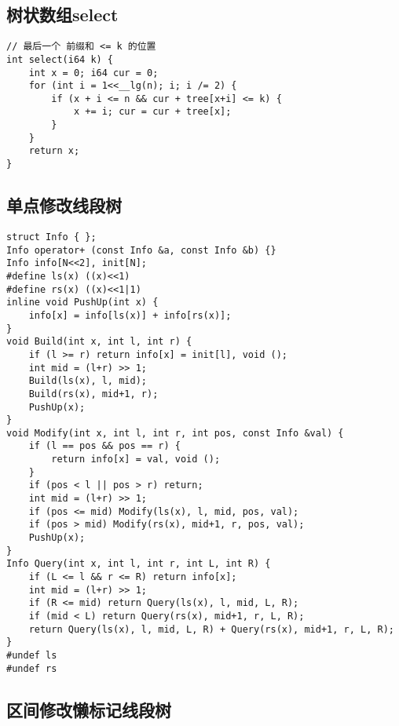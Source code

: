 \documentclass[a4paper,landscape,twocolumn]{ctexart}
\begin{document}
\subsection{树状数组select}

\begin{lstlisting}
// 最后一个 前缀和 <= k 的位置
int select(i64 k) {
	int x = 0; i64 cur = 0;
	for (int i = 1<<__lg(n); i; i /= 2) {
		if (x + i <= n && cur + tree[x+i] <= k) {
			x += i; cur = cur + tree[x];
		}
	}
	return x;
}
\end{lstlisting}

\subsection{单点修改线段树}

\begin{lstlisting}
struct Info { };
Info operator+ (const Info &a, const Info &b) {}
Info info[N<<2], init[N];
#define ls(x) ((x)<<1)
#define rs(x) ((x)<<1|1)
inline void PushUp(int x) {
	info[x] = info[ls(x)] + info[rs(x)];
}
void Build(int x, int l, int r) {
	if (l >= r) return info[x] = init[l], void ();
	int mid = (l+r) >> 1;
	Build(ls(x), l, mid);
	Build(rs(x), mid+1, r);
	PushUp(x);
}
void Modify(int x, int l, int r, int pos, const Info &val) {
	if (l == pos && pos == r) {
		return info[x] = val, void ();
	}
	if (pos < l || pos > r) return;
	int mid = (l+r) >> 1;
	if (pos <= mid) Modify(ls(x), l, mid, pos, val);
	if (pos > mid) Modify(rs(x), mid+1, r, pos, val);
	PushUp(x);
}
Info Query(int x, int l, int r, int L, int R) {
	if (L <= l && r <= R) return info[x];
	int mid = (l+r) >> 1;
	if (R <= mid) return Query(ls(x), l, mid, L, R);
	if (mid < L) return Query(rs(x), mid+1, r, L, R);
	return Query(ls(x), l, mid, L, R) + Query(rs(x), mid+1, r, L, R);
}
#undef ls
#undef rs
\end{lstlisting}

\subsection{区间修改懒标记线段树}
\end{document}
